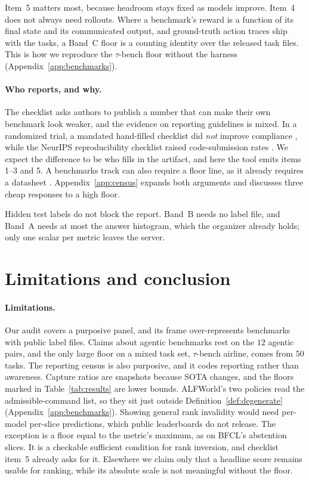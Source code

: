 \documentclass{article}
\theoremstyle{plain}
\theoremstyle{definition}
\begin{document}
Item~5 matters most, because headroom stays fixed as models improve. Item~4 does not always need rollouts. Where a benchmark's reward is a function of its final state and its communicated output, and ground-truth action traces ship with the tasks, a Band~C floor is a counting identity over the released task files. This is how we reproduce the $\tau$-bench floor without the harness (Appendix~\ref{app:benchmarks}).

\paragraph{Who reports, and why.}
The checklist asks authors to publish a number that can make their own benchmark look weaker, and the evidence on reporting guidelines is mixed. In a randomized trial, a mandated hand-filled checklist did \emph{not} improve compliance \citep{hair2019iicarus}, while the NeurIPS reproducibility checklist raised code-submission rates \citep{pineau2021reproducibility}. We expect the difference to be who fills in the artifact, and here the tool emits items 1--3 and 5. A benchmarks track can also require a floor line, as it already requires a datasheet \citep{gebru2021datasheets}. Appendix~\ref{app:census} expands both arguments and discusses three cheap responses to a high floor.

Hidden test labels do not block the report. Band~B needs no label file, and Band~A needs at most the answer histogram, which the organizer already holds; only one scalar per metric leaves the server.

\section{Limitations and conclusion}
\label{sec:limitations}

\paragraph{Limitations.}
Our audit covers a purposive panel, and its frame over-represents benchmarks with public label files. Claims about agentic benchmarks rest on the $12$ agentic pairs, and the only large floor on a mixed task set, $\tau$-bench airline, comes from $50$ tasks. The reporting census is also purposive, and it codes reporting rather than awareness. Capture ratios are snapshots because SOTA changes, and the floors marked in Table~\ref{tab:results} are lower bounds. ALFWorld's two policies read the admissible-command list, so they sit just outside Definition~\ref{def:degenerate} (Appendix~\ref{app:benchmarks}). Showing general rank invalidity would need per-model per-slice predictions, which public leaderboards do not release. The exception is a floor equal to the metric's maximum, as on BFCL's abstention slices. It is a checkable sufficient condition for rank inversion, and checklist item~5 already asks for it. Elsewhere we claim only that a headline score remains usable for ranking, while its absolute scale is not meaningful without the floor.
\end{document}
